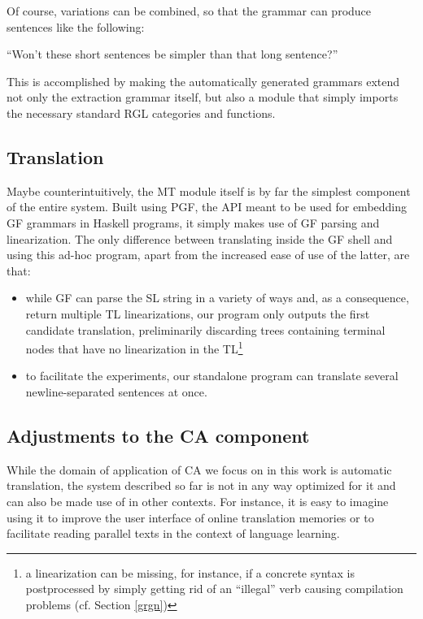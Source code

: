 Of course, variations can be combined, so that the grammar can produce sentences like the following:

\begin{example}
    ``Won't these short sentences be simpler than that long sentence?''
\end{example}

This is accomplished by making the automatically generated grammars extend not only the extraction grammar itself, but also a module that simply imports the necessary standard RGL categories and functions.

\subsection{Translation} \label{mt}
Maybe counterintuitively, the MT module itself is by far the simplest component of the entire system. Built using PGF, the API meant to be used for embedding GF grammars in Haskell programs, it simply makes use of GF parsing and linearization.
The only difference between translating inside the GF shell and using this ad-hoc program, apart from the increased ease of use of the latter, are that: \smallskip

\begin{itemize}
    \item while GF can parse the SL string in a variety of ways and, as a consequence, return multiple TL linearizations, our program only outputs the first candidate translation, preliminarily discarding trees containing terminal nodes that have no linearization in the TL\footnote{a linearization can be missing, for instance, if a concrete syntax is postprocessed by simply getting rid of an ``illegal'' verb causing compilation problems (cf. Section \ref{grgn})} 
    \item to facilitate the experiments, our standalone program can translate several newline-separated sentences at once.
\end{itemize}

\subsection{Adjustments to the CA component} \label{tuning}

While the domain of application of CA we focus on in this work is automatic translation, the system described so far is not in any way optimized for it and can also be made use of in other contexts. 
For instance, it is easy to imagine using it to improve the user interface of online translation memories or to facilitate reading parallel texts in the context of language learning. \smallskip

